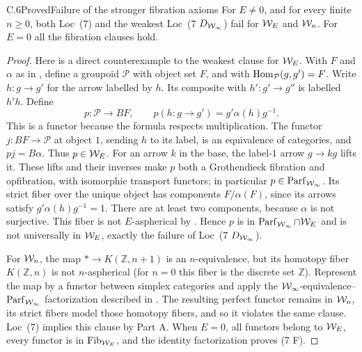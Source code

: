 \begin{claim}{C.6}{Proved}{Failure of the stronger fibration axioms}
For $E\neq0$, and for every finite $n\geq0$, both Loc~(7) and the
weakest Loc~(7 $D_{\mathcal{W}_{\infty}}$) fail for $\mathcal{W}_E$ and $\mathcal{W}_n$.
For $E=0$ all the fibration clauses hold.
\end{claim}
\begin{proof}
Here is a direct counterexample to the weakest clause for $\mathcal{W}_E$.
With $F$ and $\alpha$ as in , define a groupoid
$\mathcal P$ with object set $F$, and with
$\operatorname{Hom}_{\mathcal P}(g,g')=F$. Write $h:g\to g'$ for the arrow labelled
by $h$. Its composite with $h':g'\to g''$ is labelled $h'h$.
Define
\[
 p:\mathcal P\longrightarrow BF,\qquad
 p(h:g\to g')=g'\alpha(h)g^{-1}.
\]
This is a functor because the formula respects multiplication.
The functor $j:BF\to\mathcal P$ at object $1$, sending $h$ to its
label, is an equivalence of categories, and $pj=B\alpha$.
Thus $p\in\mathcal{W}_E$. For an arrow $k$ in the base, the label-$1$
arrow $g\to kg$ lifts it. These lifts and their inverses make $p$
both a Grothendieck fibration and opfibration, with isomorphic
transport functors; in particular $p\in\operatorname{Parf}_{\mathcal{W}_{\infty}}$.
Its strict fiber over the unique object has components
$F/\alpha(F)$, since its arrows satisfy
$g'\alpha(h)g^{-1}=1$. There are at least two components, because
$\alpha$ is not surjective. This fiber is not $E$-aspherical by
. Hence $p$ is in $\operatorname{Parf}_{\mathcal{W}_{\infty}}\cap\mathcal{W}_E$ and is
not universally in $\mathcal{W}_E$, exactly the failure of
Loc~(7 $D_{\mathcal{W}_{\infty}}$).

For $\mathcal{W}_n$, the map $*\to K(\mathbb Z,n+1)$ is an $n$-equivalence,
but its homotopy fiber $K(\mathbb Z,n)$ is not $n$-aspherical
(for $n=0$ this fiber is the discrete set $\mathbb Z$).
Represent the map by a functor between simplex categories and
apply the $\mathcal{W}_{\infty}$-equivalence--$\operatorname{Parf}_{\mathcal{W}_{\infty}}$ factorization
described in . The resulting perfect functor remains
in $\mathcal{W}_n$, its strict fibers model those homotopy fibers, and so it
violates the same clause. Loc~(7) implies this clause by Part A.
When $E=0$, all functors belong to $\mathcal{W}_E$, every functor is in
$\operatorname{Fib}_{\mathcal{W}_E}$, and the identity factorization proves (7 F).
\end{proof}

